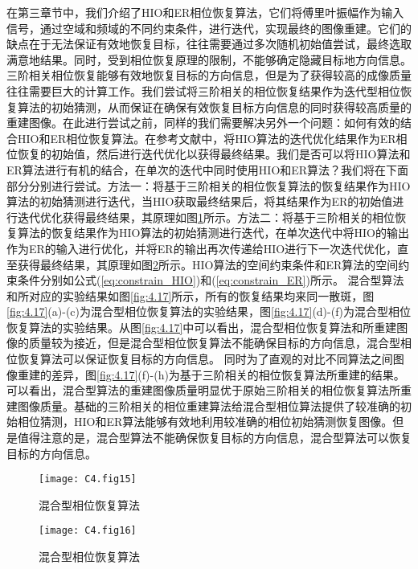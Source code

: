 在第三章节中，我们介绍了HIO和ER相位恢复算法，它们将傅里叶振幅作为输入信号，通过空域和频域的不同约束条件，进行迭代，实现最终的图像重建。它们的缺点在于无法保证有效地恢复目标，往往需要通过多次随机初始值尝试，最终选取满意地结果。同时，受到相位恢复原理的限制，不能够确定隐藏目标地方向信息。三阶相关相位恢复能够有效地恢复目标的方向信息，但是为了获得较高的成像质量往往需要巨大的计算工作。我们尝试将三阶相关的相位恢复结果作为迭代型相位恢复算法的初始猜测，从而保证在确保有效恢复目标方向信息的同时获得较高质量的重建图像。在此进行尝试之前，同样的我们需要解决另外一个问题：如何有效的结合HIO和ER相位恢复算法。在参考文献\cite*{bertolotti_non-invasive_2012,katz_non-invasive_2014}中，将HIO算法的迭代优化结果作为ER相位恢复的初始值，然后进行迭代优化以获得最终结果。我们是否可以将HIO算法和ER算法进行有机的结合，在单次的迭代中同时使用HIO和ER算法？我们将在下面部分分别进行尝试。方法一：将基于三阶相关的相位恢复算法的恢复结果作为HIO算法的初始猜测进行迭代，当HIO获取最终结果后，将其结果作为ER的初始值进行迭代优化获得最终结果，其原理如图\ref{fig:4.15}所示。方法二：将基于三阶相关的相位恢复算法的恢复结果作为HIO算法的初始猜测进行迭代，在单次迭代中将HIO的输出作为ER的输入进行优化，并将ER的输出再次传递给HIO进行下一次迭代优化，直至获得最终结果，其原理如图\ref{fig:4.16}所示。HIO算法的空间约束条件和ER算法的空间约束条件分别如公式(\ref{eq:constrain_HIO})和(\ref{eq:constrain_ER})所示。
混合型算法和所对应的实验结果如图\ref{fig:4.17}所示，所有的恢复结果均来同一散斑，图\ref{fig:4.17}(a)-(c)为混合型相位恢复算法的实验结果，图\ref{fig:4.17}(d)-(f)为混合型相位恢复算法的实验结果。从图\ref{fig:4.17}中可以看出，混合型相位恢复算法和所重建图像的质量较为接近，但是混合型相位恢复算法不能确保目标的方向信息，混合型相位恢复算法可以保证恢复目标的方向信息。
同时为了直观的对比不同算法之间图像重建的差异，图\ref{fig:4.17}(f)-(h)为基于三阶相关的相位恢复算法所重建的结果。可以看出，混合型算法的重建图像质量明显优于原始三阶相关的相位恢复算法所重建图像质量。基础的三阶相关的相位重建算法给混合型相位算法提供了较准确的初始相位猜测，HIO和ER算法能够有效地利用较准确的相位初始猜测恢复图像。但是值得注意的是，混合型算法不能确保恢复目标的方向信息，混合型算法可以恢复目标的方向信息。
\begin{figure}[htp]
	\centering
	\texttt{[image: C4.fig15]}
	\caption{混合型相位恢复算法}
	\label{fig:4.15}
\end{figure}

\begin{figure}[htp]
	\centering
	\texttt{[image: C4.fig16]}
	\caption{混合型相位恢复算法}
	\label{fig:4.16}
\end{figure}


